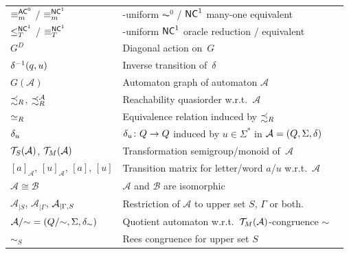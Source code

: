 \begin{longtable}{p{} p{} p{}}
	$\equiv_m^{\textup{\textsf{AC}}^{0}}$ / $\equiv_m^{\textup{\textsf{NC}}^{1}}$ & \LOGSPACE-uniform $\AC^0$ / $\textup{\textsf{NC}}^1$ many-one equivalent & \pageref{def:eqACZEROm} \\
	$\le_T^{\textup{\textsf{NC}}^{1}}$ / $\equiv_T^{\textup{\textsf{NC}}^{1}}$ & \LOGSPACE-uniform $\textup{\textsf{NC}}^1$ oracle reduction / equivalent & \pageref{def:eqACZEROm} \\
	$G^D$ & Diagonal action on~$G$ & \pageref{def:diagonal-action}\\
	$\delta^{-1}(q,u)$ & Inverse transition of~$\delta$ & \pageref{def:inverse_transition} \\
	$G(\mathcal A)$ & Automaton graph of automaton $\mathcal A$ & \pageref{def:aut_graph} \\
		$\precsim_R$, $\precsim_R^{\mathcal A}$  & Reachability quasiorder  w.r.t.~$\mathcal A$ & \pageref{def:reach_order} \\
		$\simeq_R$               & Equivalence relation induced by $\precsim_R$ & \pageref{def:induced_reach_order} \\
		${\delta}_{u}$ & ${\delta}_{u}\colon Q \to Q$ induced by $u \in \Sigma^*$ in $\mathcal A = (Q, \Sigma, \delta)$ & \pageref{def:fwordu} \\
	$\mathcal T_S(\mathcal A)$, $\mathcal T_M(\mathcal A)$ & Transformation semigroup/monoid of~$\mathcal A$ & \pageref{def:transformation_semigroup} \\
			$[a]_{\mathcal A}$, $[u]_{\mathcal A}$, $[a]$, $[u]$  & Transition matrix for letter/word $a$/$u$ w.r.t.~$\mathcal A$ & \pageref{def:transitionmtx} \\	
	$\mathcal A \cong \mathcal B$ & $\mathcal A$ and $\mathcal B$ are isomorphic & \pageref{def:isomorphic} \\
				$\mathcal A_{|S}$,
	$\mathcal A_{|\Gamma}$,
	$\mathcal A_{|\Gamma, S}$ & Restriction of $\mathcal A$ to upper set $S$, $\Gamma$ or both. & \pageref{def:restriction_aut} \\
		$\mathcal A / {\sim} = (Q / {\sim}, \Sigma, \delta_{\sim})$& Quotient automaton w.r.t.~$\mathcal T_M(\mathcal A)$-congruence $\sim$ & \pageref{def:factor_aut} \\
	$\sim_S$                 & Rees congruence for upper set $S$ & \pageref{def:Rees_congruence} \\

\end{longtable}
